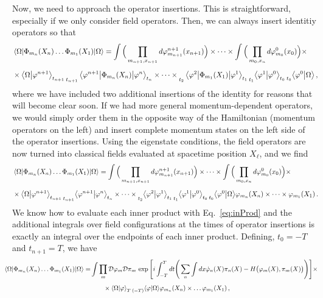 \documentclass{article}
\numberwithin{equation}{subsection}
\begin{document}
Now, we need to approach the operator insertions. This is straightforward, especially if we only consider field
operators. Then, we can always insert identitiy operators so that
\begin{equation}\begin{split}
    &\mel{\Omega}{\Phi_{m_n}(X_n)\dots \Phi_{m_1}(X_1)}{\Omega} = \int \Big(\prod_{{m_{n+1}}, x_{n+1}}d\varphi^{n+1}_{m_{n+1}}(x_{n+1})\Big)\times\dots\times 
	\int \Big(\prod_{{m_0}, x_n}d\varphi^0_{m_0}(x_0)\Big) \times \\[0.5em]
    &\times \braket{\Omega}{\varphi^{n+1}}_{t_{n+1}}\prescript{}{t_{n+1}}{\mel{\varphi^{n+1}}{\Phi_{m_n}(X_n)}{\varphi^n}_{t_n}}\times\dots\times 
	\prescript{}{t_2}{\mel{\varphi^2}{\Phi_{m_1}(X_1)}{\varphi^1}_{t_1}}\prescript{}{t_1}{\braket{\varphi^1}{\varphi^0}_{t_0}}\prescript{}{t_0}{\braket{\varphi^0}{\Omega}}\,,
\end{split}\end{equation}
where we have included two additional insertions of the identity for reasons that will become clear soon. If we had more general momentum-dependent operators, we would simply order 
them in the opposite way of the Hamiltonian (momentum operators on the left) and insert complete momentum states on the left side of the operator insertions. Using the eigenstate 
conditions, the field operators are now turned into classical fields evaluated at spacetime position $X_\ell$, and we find
\begin{equation}\begin{split}
    &\mel{\Omega}{\Phi_{m_n}(X_n)\dots \Phi_{m_1}(X_1)}{\Omega} = \int \Big(\prod_{{m_{n+1}}, x_{n+1}}d\varphi^{n+1}_{m_{n+1}}(x_{n+1})\Big)\times\dots\times 
	\int \Big(\prod_{{m_0}, x_n}d\varphi^0_{m_0}(x_0)\Big) \times \\[0.5em]
    &\times \braket{\Omega}{\varphi^{n+1}}_{t_{n+1}}\prescript{}{t_{n+1}}{\braket{\varphi^{n+1}}{\varphi^n}_{t_n}}\times\dots\times \prescript{}{t_2}{\braket{\varphi^2}{\varphi^1}_{t_1}}
	\prescript{}{t_1}{\braket{\varphi^1}{\varphi^0}_{t_0}}\prescript{}{t_0}{\braket{\varphi^0}{\Omega}}\varphi_{m_n}(X_n)\times\dots\times\varphi_{m_1}(X_1)\,.
\end{split}\end{equation}
We know how to evaluate each inner product with Eq.~\eqref{eq:inProd} and the additional integrals over field configurations at the times of operator insertions is exactly an 
integral over the endpoints of each inner product. Defining, $t_0 = -T$ and $t_{n+1} = T$, we have
\begin{equation}\begin{split}
    \hspace{-0.5cm}
    \mel{\Omega}{\Phi_{m_n}(X_n)\dots \Phi_{m_1}(X_1)}{\Omega} =& \int\prod_m\mathcal{D}\varphi_m\mathcal{D}\pi_m\,\exp\Bigg[i\int_{-T}^{T}dt
	\Bigg(\sum_n\int dx\dot{\varphi}_n(X)\pi_n(X) - H\big(\varphi_m(X), \pi_m(X)\big)\Bigg)\Bigg]\times \\[0.5em]
    &\qquad\times\braket{\Omega}{\varphi}_T\prescript{}{(-T)}{\braket{\varphi}{\Omega}}\varphi_{m_n}(X_n)\times\dots \varphi_{m_1}(X_1)\,,
\end{split}\end{equation}
\end{document}
